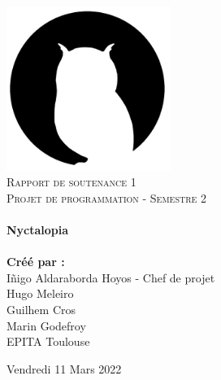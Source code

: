\begin{titlepage}
    \vbox{ }

    \vbox{ }

    \begin{center}
        \includegraphics[width=0.40\textwidth]{img/logos/logo.png}\\[1cm]
        \textsc{\Large Rapport de soutenance 1}\\[0.2cm]
        \textsc{\Large Projet de programmation - Semestre 2}\\[0.6cm]

        \noindent\makebox[\linewidth]{\rule{.7\paperwidth}{.6pt}}\\[0.7cm]
        { \huge \bfseries Nyctalopia}\\[0.25cm]
        \noindent\makebox[\linewidth]{\rule{.7\paperwidth}{.6pt}}\\[0.7cm]
        \large{\bfseries Créé par :}\\[0.1cm]
        \large{Iñigo Aldaraborda Hoyos - Chef de projet}\\[0.1cm]
        \large{Hugo Meleiro}\\[0.1cm]
        \large{Guilhem Cros}\\[0.1cm]
        \large{Marin Godefroy}\\[0.1cm]
        \vfill
        \large
        EPITA Toulouse

            {\large Vendredi 11 Mars 2022}
    \end{center}
\end{titlepage}
